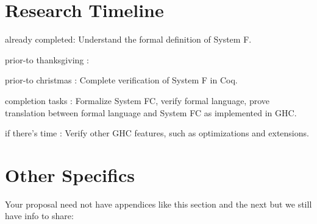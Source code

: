 \documentclass{sig-alternate}
\begin{document}
\section{Research Timeline}
\label{sec:research_timeline}
\begin{itemize*}
	\item {\sc already completed}: Understand the formal definition of System F.
	\item {\sc prior-to thanksgiving} : 
	\item {\sc prior-to christmas} : Complete verification of System F in Coq.
	\item {\sc completion tasks} : Formalize System FC, verify formal language, prove translation between formal language and System FC as implemented in GHC.
	\item {\sc if there's time} : Verify other GHC features, such as optimizations and extensions.
\end{itemize*}


\vspace{175pt}

\appendix
\section{Other Specifics}
\label{app:other_specifics}
Your proposal need not have appendices like this section and the next
but we still have info to share:

\end{document}
